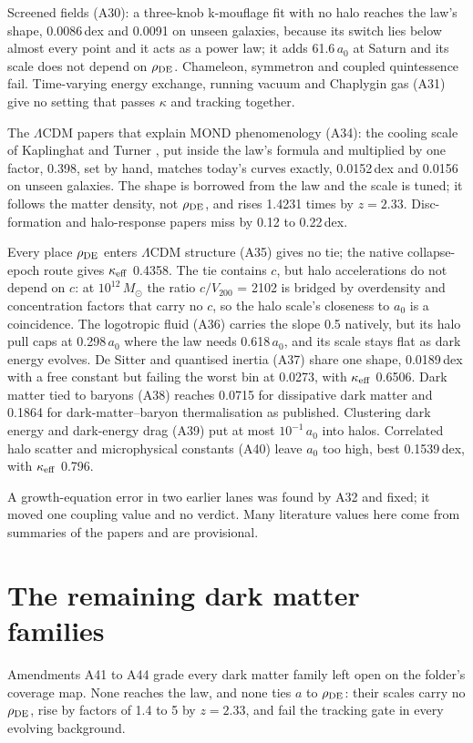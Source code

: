 \documentclass[11pt]{article}
\begin{document}
Screened fields (A30): a three-knob k-mouflage fit with no halo reaches the law's shape, 0.0086\,dex and 0.0091 on unseen galaxies, because its switch lies below almost every point and it acts as a power law; it adds 61.6\,$a_0$ at Saturn and its scale does not depend on $\rho_{\rm DE}$. Chameleon, symmetron and coupled quintessence fail. Time-varying energy exchange, running vacuum and Chaplygin gas (A31) give no setting that passes $\kappa$ and tracking together.

The $\Lambda$CDM papers that explain MOND phenomenology (A34): the cooling scale of Kaplinghat and Turner \cite{kaplinghat02}, put inside the law's formula and multiplied by one factor, 0.398, set by hand, matches today's curves exactly, 0.0152\,dex and 0.0156 on unseen galaxies. The shape is borrowed from the law and the scale is tuned; it follows the matter density, not $\rho_{\rm DE}$, and rises 1.4231 times by $z=2.33$. Disc-formation and halo-response papers miss by 0.12 to 0.22\,dex.

Every place $\rho_{\rm DE}$ enters $\Lambda$CDM structure (A35) gives no tie; the native collapse-epoch route gives $\kappa_{\rm eff}$ 0.4358. The tie contains $c$, but halo accelerations do not depend on $c$: at $10^{12}\,M_\odot$ the ratio $c/V_{200}$ = 2102 is bridged by overdensity and concentration factors that carry no $c$, so the halo scale's closeness to $a_0$ is a coincidence. The logotropic fluid \cite{chavanis22} (A36) carries the slope 0.5 natively, but its halo pull caps at 0.298\,$a_0$ where the law needs 0.618\,$a_0$, and its scale stays flat as dark energy evolves. De Sitter and quantised inertia (A37) share one shape, 0.0189\,dex with a free constant but failing the worst bin at 0.0273, with $\kappa_{\rm eff}$ 0.6506. Dark matter tied to baryons (A38) reaches 0.0715 for dissipative dark matter and 0.1864 for dark-matter--baryon thermalisation as published. Clustering dark energy and dark-energy drag (A39) put at most $10^{-1}\,a_0$ into halos. Correlated halo scatter and microphysical constants (A40) leave $a_0$ too high, best 0.1539\,dex, with $\kappa_{\rm eff}$ 0.796.

A growth-equation error in two earlier lanes was found by A32 and fixed; it moved one coupling value and no verdict. Many literature values here come from summaries of the papers and are provisional.

\section{The remaining dark matter families}
Amendments A41 to A44 grade every dark matter family left open on the folder's coverage map. None reaches the law, and none ties $a$ to $\rho_{\rm DE}$: their scales carry no $\rho_{\rm DE}$, rise by factors of 1.4 to 5 by $z=2.33$, and fail the tracking gate in every evolving background.
\end{document}
